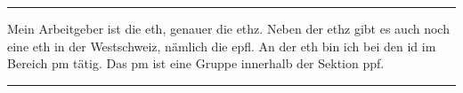 
\vspace{3em}
\hrule
\vspace{1em}

Mein Arbeitgeber ist die \ac{eth}, genauer die \ac{ethz}. Neben der \ac{ethz} gibt es auch noch eine \acs{eth} in der Westschweiz, nämlich die \ac{epfl}. An der \acs{eth} bin ich bei den \ac{id} im Bereich \ac{pm} tätig. Das \ac{pm} ist eine Gruppe innerhalb der Sektion \ac{ppf}.

\vspace{2em}
\hrule
\vspace{3em}
